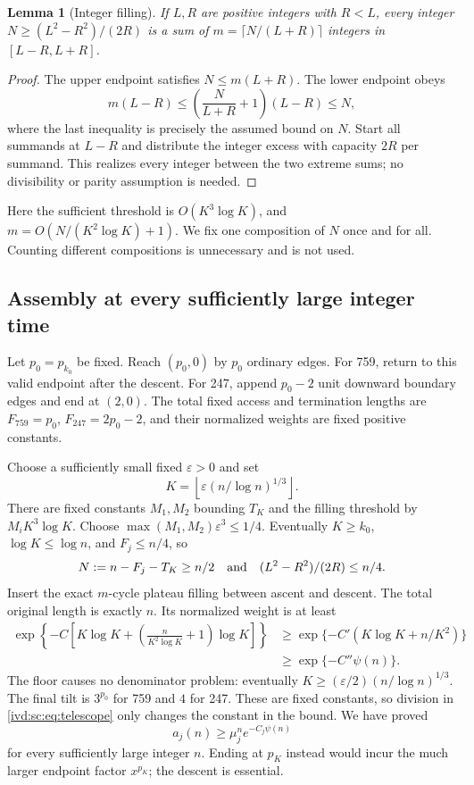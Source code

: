 \documentclass[11pt,letterpaper]{article}
\newtheorem{lemma}[theorem]{Lemma}
\theoremstyle{remark}\newtheorem{remark}[theorem]{Remark}
\numberwithin{equation}{section}
\begin{document}
\begin{lemma}[Integer filling]\label{ivd:sc:lem:fill}
If $L,R$ are positive integers with $R<L$, every integer
$N\ge (L^2-R^2)/(2R)$ is a sum of
$m=\lceil N/(L+R)\rceil$ integers in $[L-R,L+R]$.
\end{lemma}
\begin{proof}
The upper endpoint satisfies $N\le m(L+R)$. The lower endpoint obeys
\[
 m(L-R)\le\left(\frac N{L+R}+1\right)(L-R)\le N,
\]
where the last inequality is precisely the assumed bound on $N$.
Start all summands at $L-R$ and distribute the integer excess with
capacity $2R$ per summand. This realizes every integer between the two
extreme sums; no divisibility or parity assumption is needed.
\end{proof}
Here the sufficient threshold is $O(K^3\log K)$, and
$m=O(N/(K^2\log K)+1)$. We fix one composition of $N$ once and
for all. Counting different compositions is unnecessary and is not used.

\subsection{Assembly at every sufficiently large integer time}
Let $p_0=p_{k_0}$ be fixed. Reach $(p_0,0)$ by $p_0$ ordinary edges.
For 759, return to this valid endpoint after the descent. For 247,
append $p_0-2$ unit downward boundary edges and end at $(2,0)$.
The total fixed access and termination lengths are
$F_{759}=p_0$, $F_{247}=2p_0-2$, and their normalized weights are
fixed positive constants.

Choose a sufficiently small fixed $\varepsilon>0$ and set
\[
 K=\left\lfloor\varepsilon(n/\log n)^{1/3}\right\rfloor.
\]
There are fixed constants $M_1,M_2$ bounding $T_K$ and the filling
threshold by $M_iK^3\log K$. Choose
$\max(M_1,M_2)\varepsilon^3\le1/4$. Eventually $K\ge k_0$,
$\log K\le\log n$, and $F_j\le n/4$, so
\[
 N:=n-F_j-T_K\ge n/2
 \quad\hbox{and}\quad (L^2-R^2)/(2R)\le n/4.
\]
Insert the exact $m$-cycle plateau filling between ascent and descent.
The total original length is exactly $n$. Its normalized weight is at
least
\begin{align*}
 \exp\left\{-C\left[K\log K+
   \left(\frac n{K^2\log K}+1\right)\log K\right]\right\}
 &\ge \exp\{-C'(K\log K+n/K^2)\}\\
 &\ge \exp\{-C''\psi(n)\}.
\end{align*}
The floor causes no denominator problem: eventually
$K\ge(\varepsilon/2)(n/\log n)^{1/3}$.
The final tilt is $3^{p_0}$ for 759 and $4$ for 247. These are fixed
constants, so division in \eqref{ivd:sc:eq:telescope} only changes the constant
in the bound. We have proved
\begin{equation}\label{ivd:sc:eq:lower}
 a_j(n)\ge\mu_j^n e^{-C_j\psi(n)}
\end{equation}
for every sufficiently large integer $n$. Ending at $p_K$ instead would
incur the much larger endpoint factor $x^{p_K}$; the descent is essential.
\end{document}
